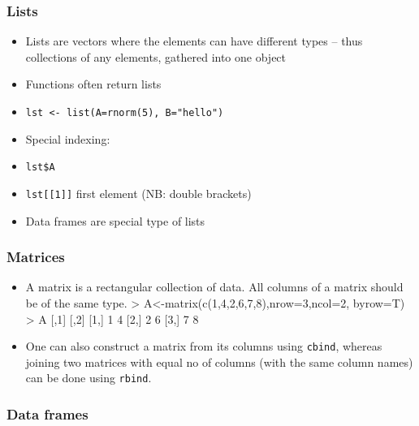 \documentclass{beamer}
\newcommand{\code}[1]{\texttt{#1}}
\let\overbatim\verbatim
\let\endoverbatim\endverbatim
\newenvironment{vcode}%
{\bgroup\baselineskip=0.8\baselineskip\overbatim}%
{\endoverbatim\egroup}
\begin{document}
\begin{frame}
  \frametitle{Lists}
  \begin{itemize}
  \item Lists are vectors where the elements can have different types -- thus collections of any elements, gathered into one object
  \item Functions often return lists
  \item \code{lst <- list(A=rnorm(5), B="hello")}
  \item Special indexing:
  \item \code{lst\$A}
  \item \code{lst[[1]]} first element (NB: double brackets)
  \item \alert{Data frames} are special type of lists
  \end{itemize}
\end{frame}

\begin{frame}[fragile]
  \frametitle{Matrices}
  \begin{itemize}
  \item A \alert{matrix} is a rectangular collection of data. All columns of a matrix should be of the same type.  
\begin{vcode}
> A<-matrix(c(1,4,2,6,7,8),nrow=3,ncol=2,
                                 byrow=T)
> A
     [,1] [,2]
[1,]    1    4
[2,]    2    6
[3,]    7    8

\end{vcode}
  \item One can also construct a matrix from its
    columns using \code{cbind}, whereas joining two matrices with equal no of columns (with the same column names) can be done using \code{rbind}.
  \end{itemize}
\end{frame}

\begin{frame}[fragile]
  \frametitle{Data frames}
\end{frame}
\end{document}
